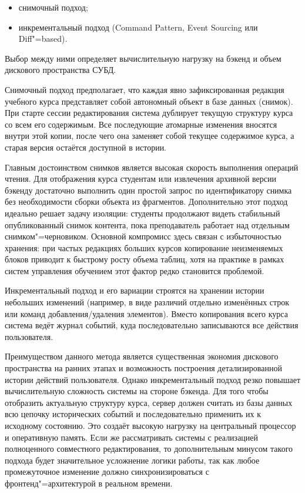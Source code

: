 \documentclass[coursework]{SCWorks}
\begin{document}
\begin{itemize}
  \item снимочный подход;
  \item инкрементальный подход (Command Pattern, Event Sourcing или Diff"=based).
\end{itemize}

Выбор между ними определяет вычислительную нагрузку на бэкенд и объем дискового пространства СУБД.

Снимочный подход предполагает, что каждая явно зафиксированная редакция учебного курса представляет собой автономный объект в базе данных (снимок). При старте сессии редактирования система дублирует текущую структуру курса со всем его содержимым. Все последующие атомарные изменения вносятся внутри этой копии, после чего она заменяет собой текущее содержимое курса, а старая версия остаётся доступной в истории.

Главным достоинством снимков является высокая скорость выполнения операций чтения. Для отображения курса студентам или извлечения архивной версии бэкенду достаточно выполнить один простой запрос по идентификатору снимка без необходимости сборки объекта из фрагментов. Дополнительно этот подход идеально решает задачу изоляции: студенты продолжают видеть стабильный опубликованный снимок контента, пока преподаватель работает над отдельным снимком"=черновиком. Основной компромисс здесь связан с избыточностью хранения: при частых редакциях больших курсов копирование неизменяемых блоков приводит к быстрому росту объема таблиц, хотя на практике в рамках систем управления обучением этот фактор редко становится проблемой.

Инкрементальный подход и его вариации строятся на хранении истории небольших изменений (например, в виде различий отдельно изменённых строк или команд добавления/удаления элементов). Вместо копирования всего курса система ведёт журнал событий, куда последовательно записываются все действия пользователя. 

Преимуществом данного метода является существенная экономия дискового пространства на ранних этапах и возможность построения детализированной истории действий пользователя. Однако инкрементальный подход резко повышает вычислительную сложность системы на стороне бэкенда. Для того чтобы отобразить актуальную структуру курса, сервер должен считать из базы данных всю цепочку исторических событий и последовательно применить их к исходному состоянию. Это создаёт высокую нагрузку на центральный процессор и оперативную память. Если же рассматривать системы с реализацией полноценного совместного редактирования, то дополнительным минусом такого подхода будет значительное усложнение логики работы, так как любое промежуточное изменение должно синхронизироваться с фронтенд"=архитектурой в реальном времени.
\end{document}
